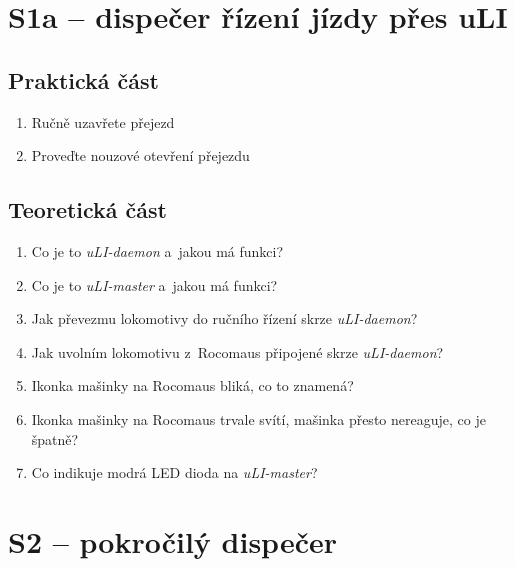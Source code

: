 \documentclass[12pt,a4paper]{article}
\begin{document}
\section*{S1a – dispečer řízení jízdy přes uLI}

\subsection*{Praktická část}

\begin{enumerate}[leftmargin=*]
\item Ručně uzavřete přejezd
\item Proveďte nouzové otevření přejezdu
\end{enumerate}

\subsection*{Teoretická část}

\begin{enumerate}[leftmargin=*]
\item Co je to \textit{uLI-daemon} a~jakou má funkci?
\item Co je to \textit{uLI-master} a~jakou má funkci?
\item Jak převezmu lokomotivy do ručního řízení skrze \textit{uLI-daemon}?
\item Jak uvolním lokomotivu z~Rocomaus připojené skrze \textit{uLI-daemon}?
\item Ikonka mašinky na Rocomaus bliká, co to znamená?
\item Ikonka mašinky na Rocomaus trvale svítí, mašinka přesto nereaguje, co je
špatně?
\item Co indikuje modrá LED dioda na \textit{uLI-master}?
\end{enumerate}


\newpage
\section*{S2 – pokročilý dispečer}
\end{document}
